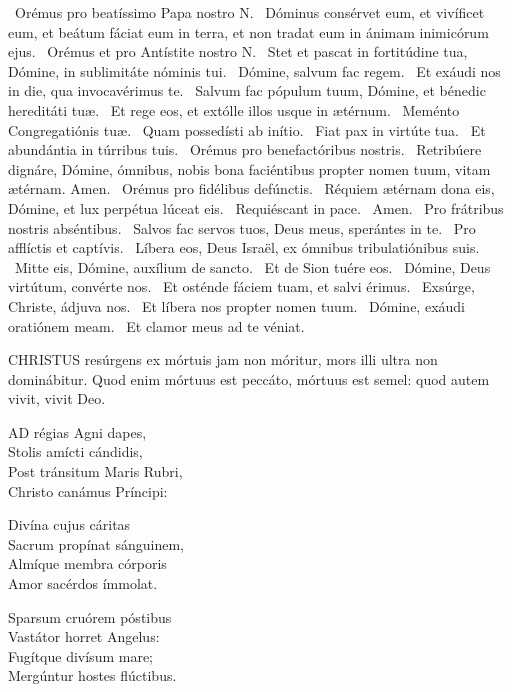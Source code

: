 \V\ Orémus pro beatíssimo Papa nostro N. \R\ Dóminus consérvet eum, et vivíficet eum, et beátum fáciat eum in terra, et non tradat eum in ánimam inimicórum ejus. \V\ Orémus et pro Antístite nostro N. \R\ Stet et pascat in fortitúdine tua, Dómine, in sublimitáte nóminis tui. \V\ Dómine, salvum fac regem. \R\ Et exáudi nos in die, qua invocavérimus te. \V\ Salvum fac pópulum tuum, Dómine, et bénedic hereditáti tuæ. \R\ Et rege eos, et extólle illos usque in ætérnum. \V\ Meménto Congregatiónis tuæ. \R\ Quam possedísti ab inítio. \V\ Fiat pax in virtúte tua. \R\ Et abundántia in túrribus tuis. \V\ Orémus pro benefactóribus nostris. \R\ Retribúere dignáre, Dómine, ómnibus, nobis bona faciéntibus propter nomen tuum, vitam ætérnam. Amen. \V\ Orémus pro fidélibus defúnctis. \R\ Réquiem ætérnam dona eis, Dómine, et lux perpétua lúceat eis. \V\ Requiéscant in pace. \R\ Amen. \V\ Pro frátribus nostris abséntibus. \R\ Salvos fac servos tuos, Deus meus, sperántes in te. \V\ Pro afflíctis et captívis. \R\ Líbera eos, Deus Israël, ex ómnibus tribulatiónibus suis. \V\ Mitte eis, Dómine, auxílium de sancto. \R\ Et de Sion tuére eos. \V\ Dómine, Deus virtútum, convérte nos. \R\ Et osténde fáciem tuam, et salvi érimus. \V\ Exsúrge, Christe, ádjuva nos. \R\ Et líbera nos propter nomen tuum. \V\ Dómine, exáudi oratiónem meam. \R\ Et clamor meus ad te véniat.




\lettrine[lines=2]{C}{HRISTUS} resúrgens ex mórtuis jam non móritur, mors illi ultra non dominábitur. Quod enim mórtuus est peccáto, mórtuus est semel: quod autem vivit, vivit Deo.


\lettrine[lines=2]{A}{D} régias Agni dapes,\\
Stolis amícti cándidis,\\
Post tránsitum Maris Rubri,\\
Christo canámus Príncipi:

Divína cujus cáritas\\
Sacrum propínat sánguinem,\\
Almíque membra córporis\\
Amor sacérdos ímmolat.

Sparsum cruórem póstibus\\
Vastátor horret Angelus:\\
Fugítque divísum mare;\\
Mergúntur hostes flúctibus.

